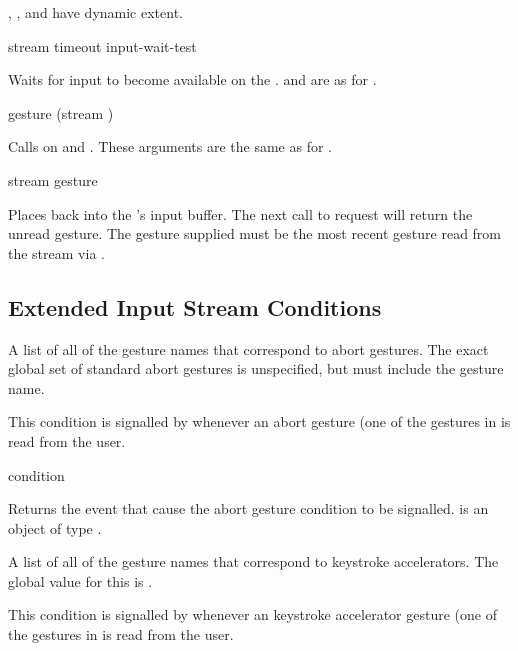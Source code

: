 , , and
 have dynamic extent.


 {stream \key timeout input-wait-test}

Waits for input to become available on the 
.   and  are as for
.


 {gesture \key (stream )}

Calls  on  and .  These
arguments are the same as for .

 {stream gesture}

Places  back into the  's
input buffer.  The next call to  request will return the
unread gesture.  The gesture supplied must be the most recent gesture read from
the stream via .


\subsection {Extended Input Stream Conditions}


A list of all of the gesture names that correspond to abort gestures.  The
exact global set of standard abort gestures is unspecified, but must include
the  gesture name.


This condition is signalled by  whenever an abort gesture (one
of the gestures in  is read from the user.

 {condition}

Returns the event that cause the abort gesture condition to be signalled.
 is an object of type .


A list of all of the gesture names that correspond to keystroke accelerators.
The global value for this is .


This condition is signalled by  whenever an keystroke
accelerator gesture (one of the gestures in  is
read from the user.

